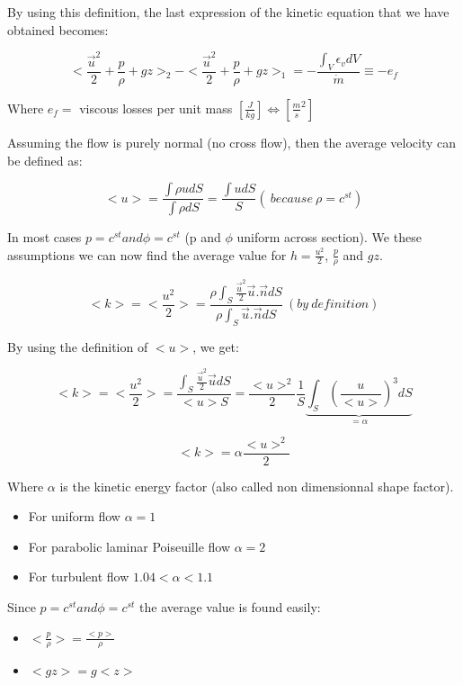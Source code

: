 By using this definition, the last expression of the kinetic equation that we have obtained becomes:

\begin{equation}
<\frac{\vec{u}^2}{2}+\frac{p}{\rho}+gz>_{2} - <\frac{\vec{u}^2}{2}+\frac{p}{\rho}+gz>_{1}=-\frac{ \int_V \epsilon_v dV }{\dot{m}} \equiv -e_f
\end{equation}

Where $e_f=$ viscous losses per unit mass $[\frac{J}{kg}] \Leftrightarrow [{\frac{m}{s}}^2]$

Assuming the flow is purely normal (no cross flow), then the average velocity can be defined as:

\begin{equation}
<u>=\frac{\int \rho u dS}{\int \rho dS}=\frac{\int  u dS}{S} (\ because \ \rho=c^{st})
\end{equation}

In most cases $p=c^{st} and \phi=c^{st}$ (p and $\phi$ uniform across section). We these assumptions we can now find the average value for $h=\frac{u^2}{2}$, $\frac{p}{\rho}$ and $gz$.

\begin{equation}
<k>=<\frac{u^2}{2}>=\frac{\rho \int_S \frac{\vec{u}^2}{2} \vec{u}.\vec{n}  dS} {\rho \int_S  \vec{u}.\vec{n}  dS} \ (by \ definition)
\end{equation}

By using the definition of $<u>$, we get:

\begin{equation}
<k>=<\frac{u^2}{2}>=\frac{\int_S \frac{\vec{u}^2}{2} \vec{u}dS} {<u>S}=\frac{<u>^2}{2} \frac{1}{S} 
\underbrace{\int_S (\frac{u}{<u>})^3 dS}_{=\alpha}
\end{equation}

\begin{equation}
<k>=\alpha \frac{<u>^2}{2}
\end{equation}

Where $\alpha$ is the kinetic energy factor (also called non dimensionnal shape factor).
\begin{itemize}
\item For uniform flow $\alpha=1$
\item For parabolic laminar Poiseuille flow $\alpha=2$
\item For turbulent flow $1.04<\alpha<1.1$
\end{itemize}

Since  $p=c^{st} and \phi=c^{st}$ the average value is found easily:
\begin{itemize}
\item $<\frac{p}{\rho}>=\frac{<p>}{\rho}$
\item $<gz>=g<z>$
\end{itemize}

